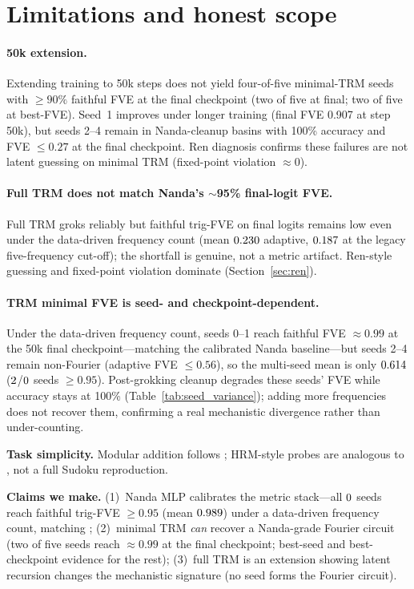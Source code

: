 \section{Limitations and honest scope}

\paragraph{50k extension.}
Extending training to 50k steps does not yield four-of-five minimal-TRM seeds with $\geq 90\%$ faithful FVE at the final checkpoint (two of five at final; two of five at best-FVE).
Seed~1 improves under longer training (final FVE 0.907 at step 50k), but seeds 2--4 remain in Nanda-cleanup basins with 100\% accuracy and FVE $\leq 0.27$ at the final checkpoint.
Ren diagnosis confirms these failures are not latent guessing on minimal TRM (fixed-point violation $\approx 0$).

\paragraph{Full TRM does not match Nanda's $\sim$95\% final-logit FVE.}
Full TRM groks reliably but faithful trig-FVE on final logits remains low even
under the data-driven frequency count (mean $0.230$ adaptive,
$0.187$ at the legacy five-frequency cut-off); the shortfall is genuine,
not a metric artifact. Ren-style guessing and fixed-point violation dominate
(Section~\ref{sec:ren}).

\paragraph{TRM minimal FVE is seed- and checkpoint-dependent.}
Under the data-driven frequency count, seeds 0--1 reach faithful FVE $\approx 0.99$
at the 50k final checkpoint---matching the calibrated Nanda baseline---but seeds
2--4 remain non-Fourier (adaptive FVE $\leq 0.56$), so the multi-seed mean is only
$0.614$ ($2$/$0$ seeds
$\geq 0.95$). Post-grokking cleanup degrades these seeds' FVE while accuracy stays
at 100\% (Table~\ref{tab:seed_variance}); adding more frequencies does not recover
them, confirming a real mechanistic divergence rather than under-counting.

\textbf{Task simplicity.}
Modular addition follows \citet{nanda2023progress}; HRM-style probes are analogous to \citet{ren2026reasoning}, not a full Sudoku reproduction.

\textbf{Claims we make.}
(1)~Nanda MLP calibrates the metric stack---all $0$ seeds reach
faithful trig-FVE $\geq 0.95$ (mean $0.989$) under a data-driven
frequency count, matching \citet{nanda2023progress};
(2)~minimal TRM \emph{can} recover a Nanda-grade Fourier circuit (two of five
seeds reach $\approx 0.99$ at the final checkpoint; best-seed and best-checkpoint
evidence for the rest);
(3)~full TRM is an extension showing latent recursion changes the mechanistic
signature (no seed forms the Fourier circuit).

